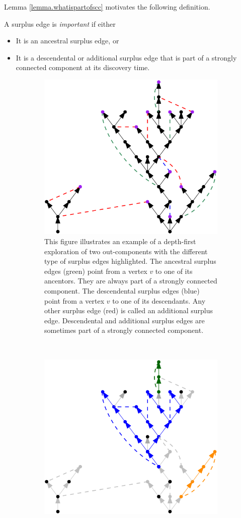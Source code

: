 Lemma \ref{lemma.whatispartofscc} motivates the following definition.
\begin{definition}
A surplus edge is \emph{important} if either
\begin{itemize}
    \item It is an ancestral surplus edge, or
    \item It is a descendental or additional surplus edge that is part of a strongly connected component at its discovery time.
\end{itemize}
\end{definition}
\begin{figure}
\centering
\begin{subfigure}{0.7\textwidth}
 \centering
    \includegraphics[width=0.7\linewidth]{Content/Pictures/Types of surplus edges.png}
    \caption{This figure illustrates an example of a depth-first exploration of two out-components with the different type of surplus edges highlighted. The ancestral surplus edges (green) point from a vertex $v$ to one of its ancentors. They are always part of a strongly connected component. The descendental surplus edges (blue) point from a vertex $v$ to one of its descendants.  Any other surplus edge (red) is called an additional surplus edge. Descendental and additional surplus edges are sometimes part of a strongly connected component.}
    \label{subfigure.typesofsurplusedges} 
\end{subfigure}\\
\begin{subfigure}{0.7\textwidth}
  \centering
  \includegraphics[width=0.7\linewidth]{Content/Pictures/SCC in example.png}

\end{subfigure}
\end{figure}
